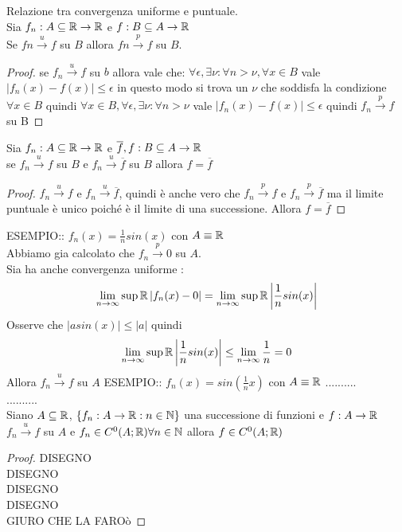 \proposition Relazione tra convergenza uniforme e puntuale.\\
Sia $f_n:A\subseteq \mathbb{R}\to \mathbb{R}$ e $f:B\subseteq A\to \mathbb{R}$\\
Se $fn\overset{u}{\to}f$ su $B$ allora $fn\overset{p}{\to}f$ su $B$.
\begin{proof}
	se $f_n\overset{u}{\to}f$ su $b$ allora vale che:
	$\forall\epsilon, \exists\nu : \forall n>\nu, \forall x\in B $ vale $\left|f_n(x)-f(x)\right|\le\epsilon$ in questo modo si trova un $\nu$ che soddisfa la condizione $\forall x \in B$ quindi $\forall x\in B, \forall\epsilon, \exists\nu : \forall n>\nu $ vale $\left|f_n(x)-f(x)\right|\le\epsilon$ quindi $f_n\overset{p}{\to}f$ su B
\end{proof}
\proposition
Sia $f_n:A\subseteq \mathbb{R}\to \mathbb{R}$ e $\overline{f},f:B\subseteq A\to \mathbb{R}$\\
se $f_n\overset{u}{\to}f$ su $B$ e $f_n\overset{u}{\to}\overline{f}$ su $B$ allora $f=\overline{f}$
\begin{proof}
	$f_n\overset{u}{\to}f$ e $f_n\overset{u}{\to}\overline{f}$, quindi è anche vero che $f_n\overset{p}{\to}f$ e $f_n\overset{p}{\to}\overline{f}$ ma il limite puntuale è unico poiché è il limite di una successione. Allora $f=\overline{f}$
\end{proof}
ESEMPIO:: $f_n(x)=\frac{1}{n}sin(x)$ con $A\equiv \mathbb{R}$\\
Abbiamo gia calcolato che $f_n\overset{p}{\to}0$ su $A$.\\
Sia ha anche convergenza uniforme :\\
$$\lim\limits_{n\to\infty}\sup{ \mathbb{R}}\left|f_n(x)-0\right| = \lim\limits_{n\to\infty}\sup{ \mathbb{R}}\left|\frac{1}{n}sin(x)\right|$$
Osserve che $\left|asin(x)\right|\le\left|a\right|$ quindi 
$$\lim\limits_{n\to\infty}\sup{ \mathbb{R}}\left|\frac{1}{n}sin(x)\right|\le\lim\limits_{n\to\infty}\frac{1}{n}=0$$
Allora $f_n\overset{u}{\to}f$ su $A$
ESEMPIO:: $f_n(x)=sin\left(\frac{1}{n}x\right)$ con $A\equiv \mathbb{R}$
..........\\
..........\\
\proposition
Siano $A\subseteq \mathbb{R}$, $\left\{f_n:A\to \mathbb{R}:n\in\mathbb{N}\right\}$ una successione di funzioni e $f:A\to \mathbb{R}$\\
$f_n\overset{u}{\to}f$ su $A$ e $f_n\in C^0(A; \mathbb{R}) \forall n\in\mathbb{N}$ allora $f\in C^0(A; \mathbb{R})$
\begin{proof}
	DISEGNO\\
	DISEGNO\\
	DISEGNO\\
	DISEGNO\\
	GIURO CHE LA FAROò
\end{proof}
